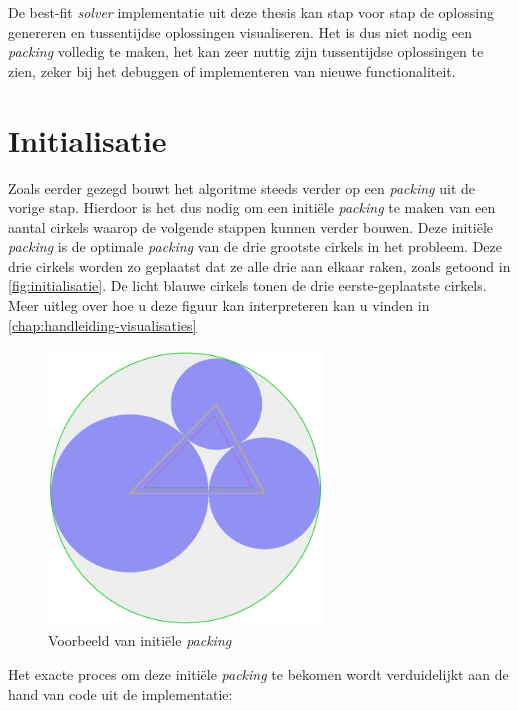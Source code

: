 \documentclass[12pt,a4paper,oneside]{book}
\begin{document}
De best-fit \textit{solver} implementatie uit deze thesis kan stap voor stap de oplossing genereren en tussentijdse oplossingen visualiseren.
Het is dus niet nodig een \textit{packing} volledig te maken, het kan zeer nuttig zijn tussentijdse oplossingen te zien, zeker bij het debuggen of implementeren van nieuwe functionaliteit.

\section{Initialisatie} \label{sec:initialisatie}

Zoals eerder gezegd bouwt het algoritme steeds verder op een \textit{packing} uit de vorige stap.
Hierdoor is het dus nodig om een initiële \textit{packing} te maken van een aantal cirkels waarop de volgende stappen kunnen verder bouwen.
Deze initiële \textit{packing} is de optimale \textit{packing} van de drie grootste cirkels in het probleem.
Deze drie cirkels worden zo geplaatst dat ze alle drie aan elkaar raken, zoals getoond in \autoref{fig:initialisatie}.
De licht blauwe cirkels tonen de drie eerste-geplaatste cirkels.
Meer uitleg over hoe u deze figuur kan interpreteren kan u vinden in \autoref{chap:handleiding-visualisaties}

\begin{figure}
  \centering
  \includegraphics[width=0.65\textwidth]{initialisatie.png}
  \caption{Voorbeeld van initiële \textit{packing}} \label{fig:initialisatie} 
\end{figure}

Het exacte proces om deze initiële \textit{packing} te bekomen wordt verduidelijkt aan de hand van code uit de implementatie:
\end{document}
